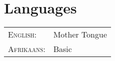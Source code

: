 
\section{Languages}

\begin{tabular}{R{2.5cm}|l}
\textsc{English:} & Mother Tongue\\

\textsc{Afrikaans:} & Basic\\
\end{tabular}
